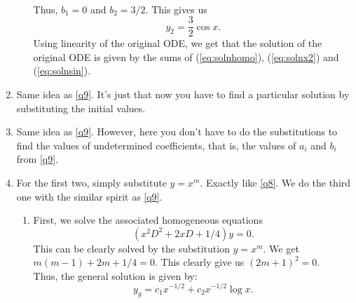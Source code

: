 \documentclass[12pt]{article}
\theoremstyle{definition}
\numberwithin{thm}{section}
\begin{document}
\begin{enumerate}[leftmargin=*, label = Q.\arabic*.]
\begin{enumerate}[start = 8, label = (\roman*)]
\begin{align*}
		\end{align*}
		Thus, $b_1 = 0$ and $b_2 = 3/2.$ This gives us
		\begin{equation} \label{eq:solnsin}
			y_2 = \frac{3}{2}\cos x.
		\end{equation}
		Using linearity of the original ODE, we get that the solution of the original ODE is given by the sums of (\ref{eq:solnhomo}), (\ref{eq:solnx2}) and (\ref{eq:solnsin}).
	\end{enumerate}
	\item Same idea as \ref{q9}. It's just that now you have to find a particular solution by substituting the initial values.
	\item Same idea as \ref{q9}. However, here you don't have to do the substitutions to find the values of undetermined coefficients, that is, the values of $a_i$ and $b_i$ from \ref{q9}.
	\item For the first two, simply substitute $y = x^m.$ Exactly like \ref{q8}. We do the third one with the similar spirit as \ref{q9}.
	\begin{enumerate}[start = 3, label = (\roman*)] 
		\item First, we solve the associated homogeneous equations
		\begin{equation*}
		 	(x^2D^2 + 2xD + 1/4)y = 0.
		\end{equation*} 
		This can be clearly solved by the substitution $y = x^{m}.$ We get $m(m - 1) + 2m + 1/4 = 0.$ This clearly give us $(2m + 1)^2 = 0.$\\
		Thus, the general solution is given by:
		\begin{equation*}
		y_g = c_1x^{-1/2} + c_2x^{-1/2}\log x.
		\end{equation*}
			

\end{enumerate}
\end{enumerate}
\end{document}
